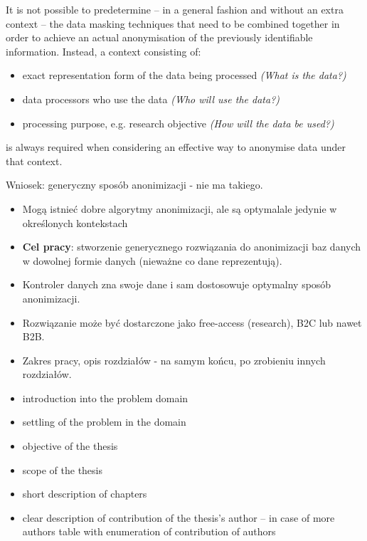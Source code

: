 \documentclass[a4paper,twoside,12pt]{book}
\begin{document}
\normalsize
\color{black}

It is not possible to predetermine – in a general fashion and without an extra context – the data masking techniques that need to be combined together in order to achieve an actual anonymisation of the previously identifiable information. Instead, a context consisting of:
\begin{itemize}
	\item exact representation form of the data being processed \textit{(What is the data?)}
	\item data processors who use the data \textit{(Who will use the data?)}
	\item processing purpose, e.g. research objective \textit{(How will the data be used?)}
\end{itemize}
is always required when considering an effective way to anonymise data under that context.\cite{bib:anonymizing_health_data}

\footnotesize
\color{blue}
Wniosek: generyczny sposób anonimizacji - nie ma takiego.

\begin{itemize}
\item Mogą istnieć dobre algorytmy anonimizacji, ale są optymalale jedynie w określonych kontekstach

\item \textbf{Cel pracy}: stworzenie generycznego rozwiązania do anonimizacji baz danych w dowolnej formie danych (nieważne co dane reprezentują).

\item Kontroler danych zna swoje dane i sam dostosowuje optymalny sposób anonimizacji.

\item Rozwiązanie może być dostarczone jako free-access (research), B2C lub nawet B2B.

\item Zakres pracy, opis rozdziałów - na samym końcu, po zrobieniu innych rozdziałów.
\normalsize

\end{itemize}
\color{black}
\normalsize


\begin{itemize}
\item introduction into the problem domain
\item settling of the problem in the domain
\item objective of the thesis 
\item scope of the thesis
\item short description of chapters
\item clear description of contribution of the thesis's author – in case of more authors table with enumeration of contribution of authors
\end{itemize}
\end{document}
